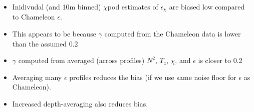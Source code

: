 \documentclass[11pt]{article}
\begin{document}
\begin{itemize}

\item Inidivudal (and 10m binned) $\chi$pod estimates of $\epsilon_{\chi}$ are biased low compared to Chameleon $\epsilon$.

\item This appears to be because $\gamma$ computed from the Chameleon data is lower than the assumed 0.2

\item $\gamma$ computed from averaged (across profiles) $N^2$, $T_z$, $\chi$, and $\epsilon$ is closer to 0.2

\item Averaging many $\epsilon$ profiles reduces the bias (if we use same noise floor for $\epsilon$ as Chameleon).

\item Increased depth-averaging also reduces bias.

\end{itemize}
\end{document}
